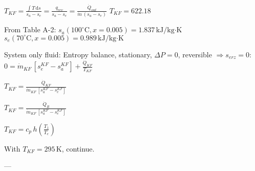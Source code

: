 \( T_{KF} = \frac{\int T \, \text{d}s}{s_a - s_e} = \frac{q_{rev}}{s_a - s_e} = \frac{\dot{Q}_{out}}{\dot{m} \, (s_a - s_e)} \)  
\( T_{KF} = 622.18 \)  

From Table A-2:  
\( s_a (100^\circ \text{C}, x = 0.005) = 1.837 \, \text{kJ/kg·K} \)  
\( s_e (70^\circ \text{C}, x = 0.005) = 0.989 \, \text{kJ/kg·K} \)  

System only fluid:  
Entropy balance, stationary, \( \Delta P = 0 \), reversible \( \Rightarrow s_{erz} = 0 \):  
\( 0 = \dot{m}_{KF} \, [s_e^{KF} - s_a^{KF}] + \frac{\dot{Q}_{KF}}{T_{KF}} \)  

\( T_{KF} = \frac{\dot{Q}_{KF}}{\dot{m}_{KF} \, [s_a^{KF} - s_e^{KF}]} \)  

\( T_{KF} = \frac{\dot{Q}_R}{\dot{m}_{KF} \, [s_a^{KF} - s_e^{KF}]} \)  

\( T_{KF} = c_p \, h \left( \frac{T_1}{T_e} \right) \)  

With \( T_{KF} = 295 \, \text{K} \), continue.  

---
